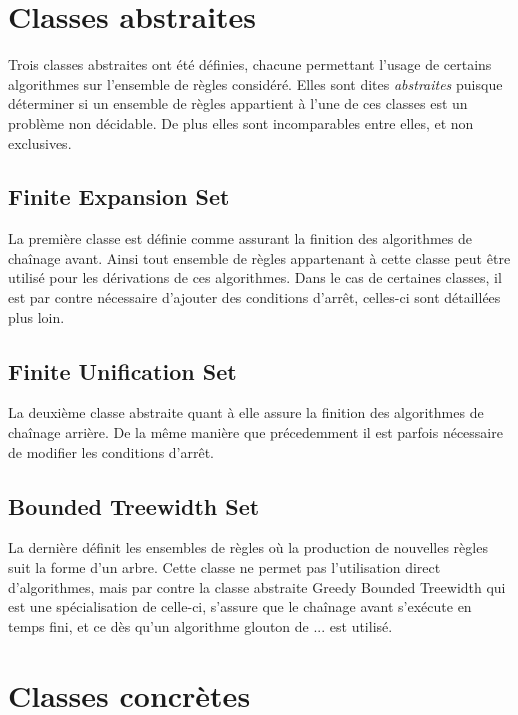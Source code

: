 
\section{Classes abstraites}\label{classes_abstraites}
Trois classes abstraites ont été définies, chacune permettant l'usage de certains
algorithmes sur l'ensemble de règles considéré.
Elles sont dites {\em abstraites} puisque déterminer si un ensemble de règles appartient
à l'une de ces classes est un problème non décidable.
De plus elles sont incomparables entre elles, et non exclusives. 

\subsection{Finite Expansion Set}\label{classes_abstraites_fus}
La première classe est définie comme assurant la finition des algorithmes de chaînage
avant. Ainsi tout ensemble de règles appartenant à cette classe peut être utilisé pour
les dérivations de ces algorithmes.
Dans le cas de certaines classes, il est par contre nécessaire d'ajouter des conditions
d'arrêt, celles-ci sont détaillées plus loin.

\subsection{Finite Unification Set}\label{classes_abstraites_fes}
La deuxième classe abstraite quant à elle assure la finition des algorithmes de chaînage
arrière. De la même manière que précedemment il est parfois nécessaire de modifier les
conditions d'arrêt.

\subsection{Bounded Treewidth Set}\label{classes_abstraites_bts}
La dernière définit les ensembles de règles où la production de nouvelles règles suit la
forme d'un arbre.
Cette classe ne permet pas l'utilisation direct d'algorithmes, mais par contre la classe
abstraite Greedy Bounded Treewidth qui est une spécialisation de celle-ci, s'assure que
le chaînage avant s'exécute en temps fini, et ce dès qu'un algorithme glouton de ... est
utilisé.


\section{Classes concrètes}\label{classes_concretes}


